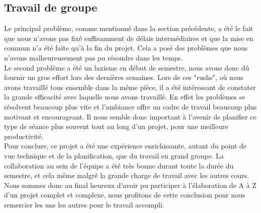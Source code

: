 \documentclass[french]{article}
\begin{document}
		\subsection{Travail de groupe}
		Le principal problème, comme mentionné dans la section précédente, a été le fait que nous n'avons pas fixé suffisamment de délais intermédiaires et que la mise en commun n'a été faite qu'à la fin du projet. Cela a posé des problèmes que nous n'avons malheureusement pas pu résoudre dans les temps.\\
		
		Le second problème a été un laxisme en début de semestre, nous avons donc dû fournir un gros effort lors des dernières semaines. Lors de ces "rushs", où nous avons travaillé tous ensemble dans la même pièce, il a été intéressant de constater la grande efficacité avec laquelle nous avons travaillé. En effet les problèmes se résolvent beaucoup plus vite et l'ambiance offre un cadre de travail beaucoup plus motivant et encourageant. Il nous semble donc important à l'avenir de planifier ce type de séance plus souvent tout au long d'un projet, pour une meilleure productivité.\\
		
		Pour conclure, ce projet a été une expérience enrichissante, autant du point de vue technique et de la planification, que du travail en grand groupe. La collaboration au sein de l'équipe a été très bonne durant toute la durée du semestre, et cela même malgré la grande charge de travail avec les autres cours. Nous sommes donc au final heureux d'avoir pu participer à l'élaboration de A à Z d'un projet complet et complexe, nous profitons de cette conclusion pour nous remercier les uns les autres pour le travail accompli.
		
		\newpage
	
	\newpage
	

			
	
	\listoffigures
			
\end{document}

